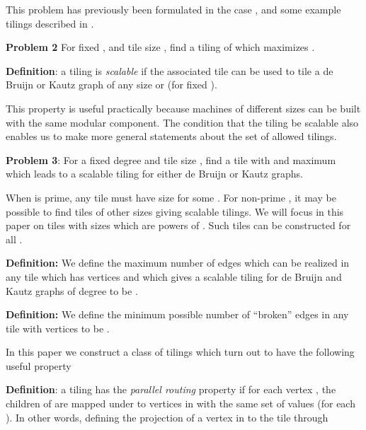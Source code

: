 \documentclass[12pt]{article}
\begin{document}
This problem has previously been formulated in the case , and
some example tilings described in \cite{Viterbi}.

\vspace*{0.1in}
\noindent
{\bf Problem 2} For fixed , and tile size ,
find a tiling of  which maximizes .
\vspace*{0.1in}


\vspace*{0.1in}
\noindent
{\bf Definition}: a tiling is {\it scalable} if the associated tile
 can be used to tile a de Bruijn or Kautz graph of any size or  (for  fixed ).
\vspace*{0.1in}

This property is useful practically because machines of different
sizes can be built with the same modular component.
The condition that the tiling be scalable also enables us to make more
general statements about the set of allowed tilings.
\vspace*{0.1in}

\noindent
{\bf Problem 3}: For a fixed degree  and tile size ,
find a tile  with  and
maximum 
which leads to a scalable tiling
for either de Bruijn or Kautz graphs.
\vspace*{0.1in}

When  is prime, any tile must have size
 for some .  For non-prime , it may be possible to find
tiles of other sizes giving scalable tilings.  We will focus in this
paper on tiles with sizes which are powers of .  Such tiles can be
constructed for all .

\vspace*{0.1in}
\noindent
{\bf Definition:} We define the maximum number of edges  which
can be realized in any tile which has  vertices and 
which gives a scalable tiling for de Bruijn and Kautz graphs of degree
 to be
.

\vspace*{0.1in}
\noindent
{\bf Definition:} We define the minimum possible number of ``broken'' edges in
any tile with  vertices to be
.
\vspace*{0.1in}



In this paper we construct a class of tilings which turn out to have
the following useful property 

\vspace*{0.1in}
\noindent
{\bf Definition}: a tiling has the {\it parallel routing} property if for
each vertex , the children of   
are mapped
under  to vertices in  with the same set of 
values  (for each ).
\vspace*{0.1in}
In other words, defining the projection  of a vertex in  to
the tile  through
\end{document}
